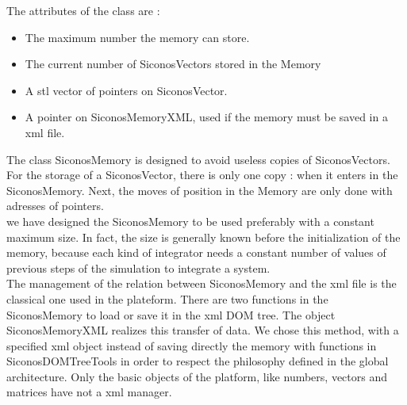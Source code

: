The attributes of the class are :
\begin{itemize}
\item The maximum number the memory can store.
\item The current number of SiconosVectors stored in the Memory
\item A \acs{stl} vector of pointers on SiconosVector.
\item A pointer on SiconosMemoryXML, used if the memory must be saved in a \ac{xml} file.
\end{itemize} 

The class SiconosMemory is designed to avoid useless copies of SiconosVectors. For the storage of a SiconosVector, there is only one copy : when it enters in the SiconosMemory. Next, the moves of position in the Memory are only done with adresses of pointers. \\
 
we have designed the SiconosMemory to be used preferably with a constant maximum size. In fact, the size is generally known before the initialization of the memory, because each kind of integrator needs a constant number of values of previous steps of the simulation to integrate a system. \\

The management of the relation between SiconosMemory and the \ac{xml} file is the classical one used in the plateform. There are two functions in the SiconosMemory to load or save it in the \ac{xml} DOM tree. The object SiconosMemoryXML realizes this transfer of data.
We chose this method, with a specified \ac{xml} object instead of saving directly the memory with functions in SiconosDOMTreeTools in order to respect the philosophy defined in the global architecture. Only the basic objects of the platform, like numbers, vectors and matrices have not a xml manager. %

